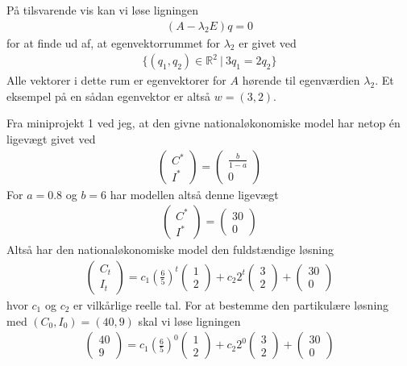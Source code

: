 \documentclass[12pt]{article}
\begin{document}
På tilsvarende vis kan vi løse ligningen
\begin{align}
(A-\lambda_2 E)q = 0
\end{align}
for at finde ud af, at egenvektorrummet for $\lambda_2$ er givet ved
\begin{align}
\{(q_1, q_2)\in \mathbb{R}^2\ |\ 3q_1 = 2q_2 \}
\end{align}
Alle vektorer i dette rum er egenvektorer for $A$ hørende til egenværdien $\lambda_2$. Et eksempel på en sådan egenvektor er altså $w = (3, 2)$.

Fra miniprojekt 1 ved jeg, at den givne nationaløkonomiske model har netop én ligevægt givet ved
\begin{align}
\begin{pmatrix}
C^*\\
I^*
\end{pmatrix}
=\begin{pmatrix}
\frac{b}{1-a}\\
0
\end{pmatrix}
\end{align}
For $a=0.8$ og $b=6$ har modellen altså denne ligevægt
\begin{align}
\begin{pmatrix}
C^*\\
I^*
\end{pmatrix}
=\begin{pmatrix}
30\\
0
\end{pmatrix}
\end{align}
Altså har den nationaløkonomiske model den fuldstændige løsning
\begin{align}
\begin{pmatrix}
C_t\\I_t
\end{pmatrix} = c_1\left(\frac{6}{5} \right)^t \begin{pmatrix} 1 \\ 2\end{pmatrix} +
c_2 2^t \begin{pmatrix} 3 \\ 2\end{pmatrix} + \begin{pmatrix}
30 \\ 0
\end{pmatrix}
\end{align}
hvor $c_1$ og $c_2$ er vilkårlige reelle tal. For at bestemme den partikulære løsning med $(C_0, I_0)=(40,9)$ skal vi løse ligningen
\begin{align}
\begin{pmatrix}
40\\9
\end{pmatrix} = c_1\left(\frac{6}{5} \right)^0 \begin{pmatrix} 1 \\ 2\end{pmatrix} +
c_2 2^0 \begin{pmatrix} 3 \\ 2\end{pmatrix} + \begin{pmatrix}
30 \\ 0
\end{pmatrix}
\end{align}
\end{document}
